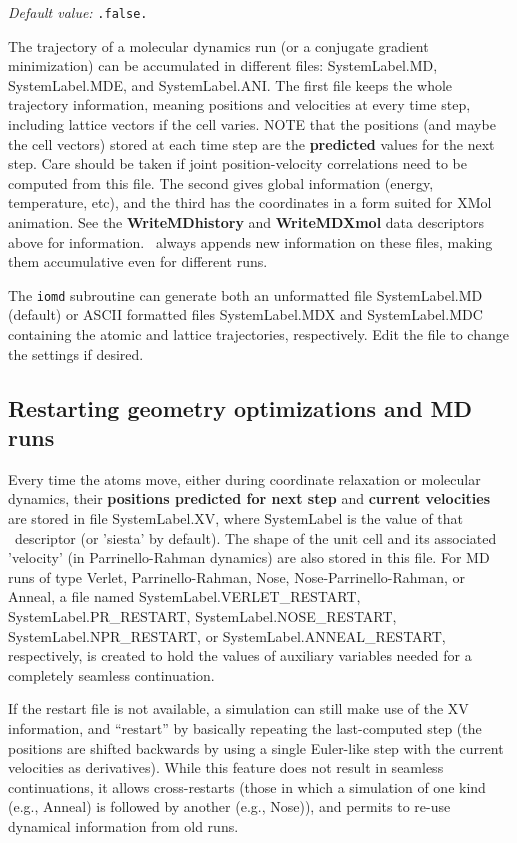 \begin{description}
\textit{Default value:} \texttt{.false.}


The trajectory of a molecular dynamics run (or a conjugate gradient
minimization) can be accumulated in different files: SystemLabel.MD,
SystemLabel.MDE, and SystemLabel.ANI. The first file keeps the whole
trajectory information, meaning positions and velocities at every time
step, including lattice vectors if the cell varies. NOTE that the
positions (and maybe the cell vectors) stored at each time step are
the \textbf{predicted} values for the next step. Care should be taken if
joint position-velocity correlations need to be computed from this
file.  The second gives global information (energy, temperature, etc),
and the third has the coordinates in a form suited for XMol animation.
See the \textbf{WriteMDhistory} and \textbf{WriteMDXmol} data descriptors
above for information. \siesta\ always appends new information on
these files, making them accumulative even for different runs.

The \texttt{iomd} subroutine can generate both an unformatted file
SystemLabel.MD (default) or ASCII formatted files SystemLabel.MDX and
SystemLabel.MDC containing the atomic and lattice trajectories,
respectively. Edit the file to change the settings if desired.


\end{description}

\subsection{Restarting geometry optimizations and MD runs}

Every time the atoms move, either during coordinate relaxation or
molecular dynamics, their \textbf{positions predicted for next step} and
\textbf{current velocities} are stored in file SystemLabel.XV, where
SystemLabel is the value of that \fdflib\ descriptor (or 'siesta' by
default).  The shape of the unit cell and its associated 'velocity'
(in Parrinello-Rahman dynamics) are also stored in this file. For MD
runs of type Verlet, Parrinello-Rahman, Nose, 
Nose-Parrinello-Rahman, or Anneal, a file named SystemLabel.VERLET\_RESTART,
SystemLabel.PR\_RESTART, SystemLabel.NOSE\_RESTART, 
SystemLabel.NPR\_RESTART, or SystemLabel.ANNEAL\_RESTART, 
respectively, is created to hold the values
of auxiliary variables needed for a completely seamless
continuation. 

If the restart file is not available, a simulation can still make use
of the XV information, and ``restart'' by basically repeating the
last-computed step (the positions are shifted backwards by using a
single Euler-like step with the current velocities as derivatives).
While this feature does not result in seamless continuations, it
allows cross-restarts (those in which a simulation of one kind (e.g.,
Anneal) is followed by another (e.g., Nose)), and permits 
to re-use dynamical information from old runs.

